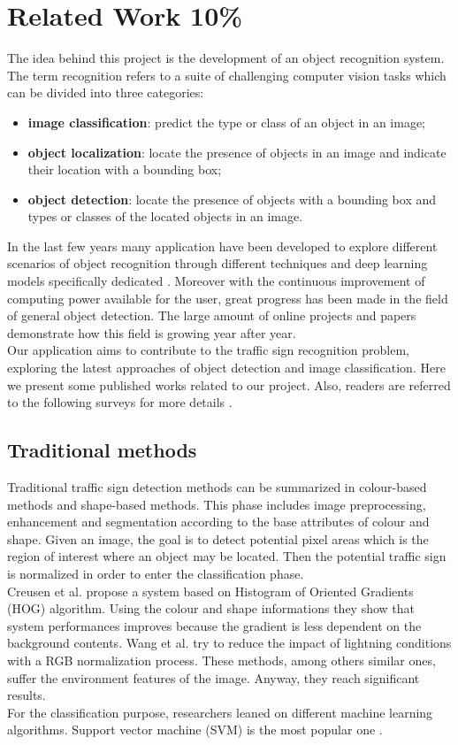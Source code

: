 \section{Related Work 10\%}
The idea behind this project is the development of an object recognition system. The term recognition refers to a suite of challenging computer vision tasks which can be divided into three categories:
\begin{itemize}[noitemsep,topsep=0pt]
	\item\textbf{image classification}: predict the type or class of an object in an image;
	\item\textbf{object localization}: locate the presence of objects in an image and indicate their location with a bounding box;
	\item\textbf{object detection}: locate the presence of objects with a bounding box and types or classes of the located objects in an image.
\end{itemize}
In the last few years many application have been developed to explore different scenarios of object recognition through different techniques and deep learning models specifically dedicated \cite{wangMethods, tsrWithCnn, tsrWithCnn2}. Moreover with the continuous improvement of computing power available for the user, great progress has been made in the field of general object detection. The large amount of online projects and papers demonstrate how this field is growing year after year.\\
Our application aims to contribute to the traffic sign recognition problem, exploring the latest approaches of object detection and image classification. Here we present some published works related to our project. Also, readers are referred to the following surveys for more details \cite{tsr20}.

\subsection{Traditional methods}
Traditional traffic sign detection methods can be summarized in colour-based methods and shape-based methods. This phase includes image preprocessing, enhancement and segmentation according to the base attributes of colour and shape. Given an image, the goal is to detect potential pixel areas which is the region of interest where an object may be located. Then the potential traffic sign is normalized in order to enter the classification phase.\\
Creusen et al. \cite{CreusenHog} propose a system based on Histogram of Oriented Gradients (HOG) algorithm. Using the colour and shape informations they show that system performances improves because the gradient is less dependent on the background contents. Wang et al. \cite{WangRGB} try to reduce the impact of lightning conditions with a RGB normalization process. These methods, among others similar ones, suffer the environment features of the image. Anyway, they reach significant results.\\
For the classification purpose, researchers leaned on different machine learning algorithms. Support vector machine (SVM) is the most popular one \cite{soendoroSVM, greenSVM, rashidSVM}.


